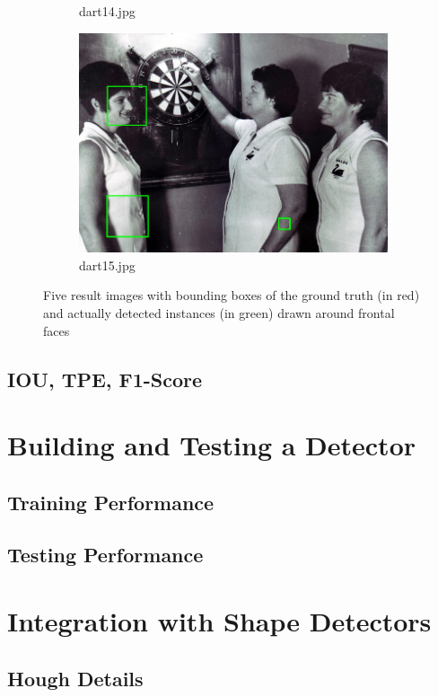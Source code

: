 \documentclass[11pt,a4paper, twocolumn]{article}
\begin{document}
\begin{figure}[h!]
\begin{subfigure}[b]{0.4\linewidth}
				\caption{dart14.jpg}
			\end{subfigure}
			\begin{subfigure}[b]{0.4\linewidth}
				\includegraphics[width=\linewidth]{dart15_post.png}
				\caption{dart15.jpg}
			\end{subfigure}
			\caption{Five  result  images  with bounding boxes of the ground truth (in red) and actually detected instances (in green) drawn around frontal faces}
			\label{fig:violajonesfaces}
		\end{figure}
	\subsection{IOU, TPE, F1-Score}
	\section{Building and Testing a Detector}
	\subsection{Training Performance}
	\subsection{Testing Performance}
	\section{Integration with Shape Detectors}
	\subsection{Hough Details}
\end{document}

